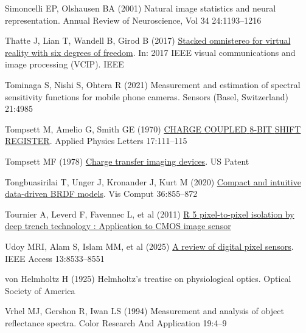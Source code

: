 \documentclass[
  letterpaper,
]{book}
\newlength{\cslhangindent}
\newenvironment{CSLReferences}[2] %
 {\begin{list}{}{%
  \setlength{\itemindent}{0pt}
  \setlength{\leftmargin}{0pt}
  \setlength{\parsep}{0pt}
  \ifodd #1
   \setlength{\leftmargin}{\cslhangindent}
   \setlength{\itemindent}{-1\cslhangindent}
  \fi
  \setlength{\itemsep}{#2\baselineskip}}}
 {\end{list}}
\begin{document}
\begin{CSLReferences}{1}{1}
Simoncelli EP, Olshausen BA (2001) Natural image statistics and neural
representation. Annual Review of Neuroscience, Vol 34 24:1193--1216

Thatte J, Lian T, Wandell B, Girod B (2017)
\href{http://dx.doi.org/10.1109/vcip.2017.8305085}{Stacked omnistereo
for virtual reality with six degrees of freedom}. In: 2017 IEEE visual
communications and image processing (VCIP). IEEE

Tominaga S, Nishi S, Ohtera R (2021) Measurement and estimation of
spectral sensitivity functions for mobile phone cameras. Sensors (Basel,
Switzerland) 21:4985

Tompsett M, Amelio G, Smith GE (1970)
\href{https://pubs.aip.org/aip/apl/article/17/3/111/42008}{{CHARGE}
{COUPLED} {8‐BIT} {SHIFT} {REGISTER}}. Applied Physics Letters
17:111--115

Tompsett MF (1978)
\href{https://patents.google.com/patent/US4085456}{Charge transfer
imaging devices}. US Patent

Tongbuasirilai T, Unger J, Kronander J, Kurt M (2020)
\href{https://link.springer.com/article/10.1007/s00371-019-01664-z}{Compact
and intuitive data-driven {BRDF} models}. Vis Comput 36:855--872

Tournier A, Leverd F, Favennec L, et al (2011)
\href{https://www.imagesensors.org/Past\%20Workshops/2011\%20Workshop/2011\%20Papers/R05_Tournier_Isolation.pdf}{{R}
5 pixel-to-pixel isolation by deep trench technology : Application to
{CMOS} image sensor}

Udoy MRI, Alam S, Islam MM, et al (2025)
\href{http://dx.doi.org/10.1109/ACCESS.2025.3526879}{A review of digital
pixel sensors}. IEEE Access 13:8533--8551

von Helmholtz H (1925) Helmholtz's treatise on physiological optics.
Optical Society of America

Vrhel MJ, Gershon R, Iwan LS (1994) Measurement and analysis of object
reflectance spectra. Color Research And Application 19:4--9


\end{CSLReferences}
\end{document}
